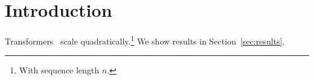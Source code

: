 \section{Introduction}\label{sec:intro}
Transformers~\cite{vaswani2017} scale quadratically.\footnote{With sequence length $n$.}
We show results in Section~\ref{sec:results}.

